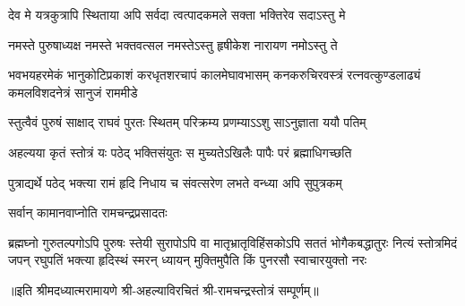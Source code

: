 \twolineshloka
{देव मे यत्रकुत्रापि स्थिताया अपि सर्वदा}
{त्वत्पादकमले सक्ता भक्तिरेव  सदाऽस्तु मे}%

\twolineshloka
{नमस्ते पुरुषाध्यक्ष नमस्ते भक्तवत्सल}
{नमस्तेऽस्तु हृषीकेश नारायण नमोऽस्तु ते}%

\fourlineindentedshloka
{भवभयहरमेकं भानुकोटिप्रकाशं}
{करधृतशरचापं कालमेघावभासम्}
{कनकरुचिरवस्त्रं रत्नवत्कुण्डलाढ्यं}
{कमलविशदनेत्रं सानुजं राममीडे}%

\twolineshloka
{स्तुत्वैवं पुरुषं साक्षाद् राघवं पुरतः स्थितम्}
{परिक्रम्य प्रणम्याऽऽशु साऽनुज्ञाता ययौ पतिम्}%

\twolineshloka
{अहल्यया कृतं स्तोत्रं यः पठेद् भक्तिसंयुतः}
{स मुच्यतेऽखिलैः पापैः परं ब्रह्माधिगच्छति}%

\twolineshloka
{पुत्राद्यर्थे पठेद् भक्त्या रामं हृदि निधाय च}
{संवत्सरेण लभते वन्ध्या अपि सुपुत्रकम्}%

\onelineshloka
{सर्वान् कामानवाप्नोति रामचन्द्रप्रसादतः}%

\fourlineindentedshloka
{ब्रह्मघ्नो गुरुतल्पगोऽपि पुरुषः स्तेयी सुरापोऽपि वा}
{मातृभ्रातृविहिंसकोऽपि सततं भोगैकबद्धातुरः}
{नित्यं स्तोत्रमिदं जपन्  रघुपतिं भक्त्या हृदिस्थं स्मरन्}
{ध्यायन् मुक्तिमुपैति किं पुनरसौ स्वाचारयुक्तो नरः}%

॥इति श्रीमदध्यात्मरामायणे श्री-अहल्याविरचितं श्री-रामचन्द्रस्तोत्रं सम्पूर्णम्॥
